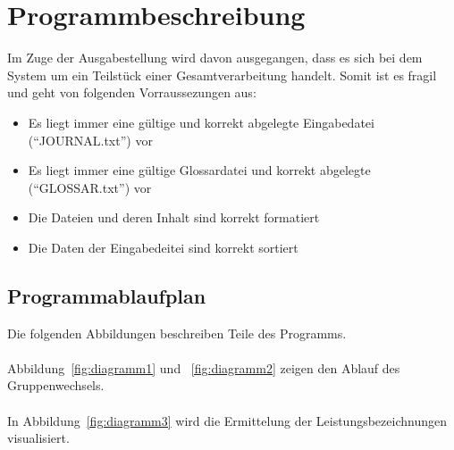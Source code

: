\chapter{Programmbeschreibung}\label{ch:programmbeschreibung}
Im Zuge der Ausgabestellung wird davon ausgegangen, dass es sich bei dem System um ein Teilstück einer Gesamtverarbeitung handelt. Somit ist es fragil und geht von folgenden Vorraussezungen aus: \\

\begin{itemize}[noitemsep]
    \item Es liegt immer eine gültige und korrekt abgelegte Eingabedatei (\enquote{JOURNAL.txt}) vor
    \item Es liegt immer eine gültige Glossardatei und korrekt abgelegte (\enquote{GLOSSAR.txt}) vor
    \item Die Dateien und deren Inhalt sind korrekt formatiert
    \item Die Daten der Eingabedeitei sind korrekt sortiert

\end{itemize}

\section{Programmablaufplan}\label{sec:pap}
Die folgenden Abbildungen beschreiben Teile des Programms.\\
\\
Abbildung~\ref{fig:diagramm1} und ~\ref{fig:diagramm2} zeigen den Ablauf des Gruppenwechsels.\\
\\
In Abbildung~\ref{fig:diagramm3} wird die Ermittelung der Leistungsbezeichnungen visualisiert.


